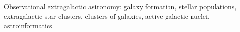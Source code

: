 Observational extragalactic astronomy: galaxy formation, stellar populations, extragalactic star clusters,
clusters of galaxies, active galactic nuclei, astroinformatics 

